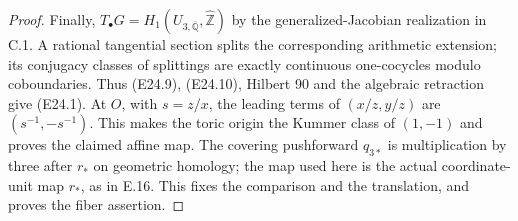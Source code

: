 \begin{proof}
Finally, $T_\bullet G=H_1(U_{3,\overline{\mathbb Q}},
\widehat{\mathbb Z})$ by the generalized-Jacobian realization in
C.1. A rational tangential section splits the corresponding
arithmetic extension; its conjugacy classes of splittings are
exactly continuous one-cocycles modulo coboundaries.
Thus (E24.9), (E24.10), Hilbert 90 and the algebraic retraction
give (E24.1). At $O$, with $s=z/x$, the leading terms of
$(x/z,y/z)$ are $(s^{-1},-s^{-1})$. This makes the toric origin
the Kummer class of $(1,-1)$ and proves the claimed affine map.
The covering pushforward $q_{3*}$ is multiplication by three
after $r_*$ on geometric homology; the map used here is the
actual coordinate-unit map $r_*$, as in E.16. This fixes the
comparison and the translation, and proves the fiber assertion.
\end{proof}

